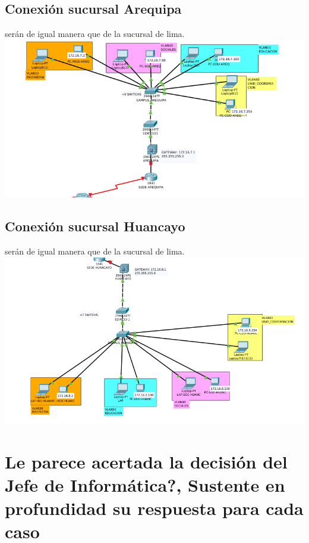 \subsection{Conexi\'on sucursal Arequipa}
ser\'an de igual manera que de la sucursal de lima.
\\
\includegraphics[scale=0.45]{img/VLANAREQUIPA.png} 

\subsection{Conexi\'on sucursal Huancayo}
ser\'an de igual manera que de la sucursal de lima.
\\
\includegraphics[scale=0.45]{img/VLANHUANCAYO.png} 


\section{\¿Le parece acertada la decisi\'on del Jefe de Inform\'atica?, Sustente en profundidad su respuesta para cada caso}
